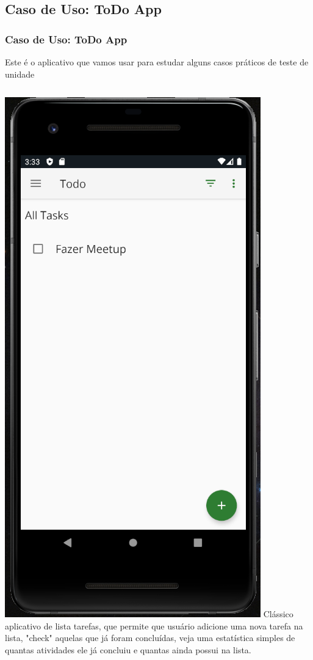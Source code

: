 \documentclass{beamer}
\begin{document}
\subsection{Caso de Uso: ToDo App}
\begin{frame}
	\frametitle{Caso de Uso: ToDo App}
	Este é o aplicativo que vamos usar para estudar alguns casos práticos de teste de unidade
	\begin{columns}[c]
		
		\includegraphics[scale=0.3]{toDoAppSample}
		Clássico aplicativo de lista tarefas, que permite que usuário adicione uma nova tarefa na lista, "check" aquelas que já foram concluídas, veja uma estatística simples de quantas atividades ele já concluiu e quantas ainda possui na lista.
		
	\end{columns}
	
\end{frame}
\end{document}
